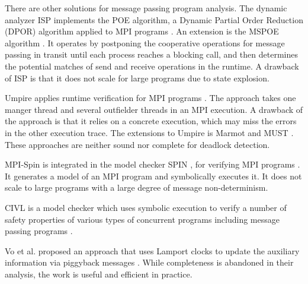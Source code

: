 There are other solutions for message passing program analysis.
The dynamic analyzer ISP implements the POE algorithm, a Dynamic Partial Order Reduction (DPOR) algorithm \cite{DBLP:conf/popl/FlanaganG05} applied to MPI programs \cite{DBLP:conf/ppopp/VakkalankaSGK08}. 
An extension is the MSPOE algorithm \cite{DBLP:conf/sbmf/SharmaGB12}. It operates by postponing the cooperative operations for message passing in transit until each process reaches a blocking call, and then determines the potential matches of send and receive operations in the runtime. 
A drawback of ISP is that it does not scale for large programs due to state explosion.

Umpire applies runtime verification for MPI programs \cite{DBLP:conf/sc/VetterS00}. The approach takes one manger thread and several outfielder threads in an MPI execution. A drawback of the approach is that it relies on a concrete execution, which may miss the errors in the other execution trace.
The extensions to Umpire is Marmot \cite{DBLP:conf/parco/KrammerBMR03} and MUST \cite{DBLP:conf/ptw/HilbrichSSM09}. These approaches are neither sound nor complete for deadlock detection. 


MPI-Spin is integrated in the model checker SPIN \cite{DBLP:journals/tse/Holzmann97}, for verifying MPI programs \cite{DBLP:conf/vmcai/Siegel07,DBLP:conf/pvm/Siegel07}. It generates a model of an MPI program and symbolically executes it. It does not scale to large programs with a large degree of message non-determinism.

CIVL is a model checker which uses symbolic execution to verify a number of safety properties of various types of concurrent programs including message passing programs \cite{DBLP:conf/kbse/ZhengRLDS15,DBLP:conf/sc/SiegelZLZMEDR15}.

Vo et al. proposed an approach that uses Lamport clocks to update the auxiliary information via piggyback messages \cite{DBLP:conf/sc/VoAGSSB10,DBLP:conf/IEEEpact/VoGKSSB11}. While completeness is abandoned in their analysis, the work is useful and efficient in practice. 



